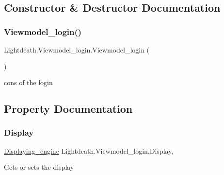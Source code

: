 \subsection{Constructor \& Destructor Documentation}
\hypertarget{class_lightdeath_1_1_viewmodel__login_a6e77485ee5cc5fce15ee6aaaa742bf7f}{}\label{class_lightdeath_1_1_viewmodel__login_a6e77485ee5cc5fce15ee6aaaa742bf7f} 
\subsubsection{\texorpdfstring{Viewmodel\+\_\+login()}{Viewmodel\_login()}}
{\footnotesize\ttfamily Lightdeath.\+Viewmodel\+\_\+login.\+Viewmodel\+\_\+login (\begin{DoxyParamCaption}{ }\end{DoxyParamCaption})\hspace{0.3cm}{\ttfamily [inline]}}



cons of the login 



\subsection{Property Documentation}
\hypertarget{class_lightdeath_1_1_viewmodel__login_a9e9f20161e479af012827444cd45bc03}{}\label{class_lightdeath_1_1_viewmodel__login_a9e9f20161e479af012827444cd45bc03} 
\subsubsection{\texorpdfstring{Display}{Display}}
{\footnotesize\ttfamily \hyperlink{class_lightdeath_1_1_displaying__engine}{Displaying\+\_\+engine} Lightdeath.\+Viewmodel\+\_\+login.\+Display\hspace{0.3cm}{\ttfamily [get]}, {\ttfamily [set]}}



Gets or sets the display 

\hypertarget{class_lightdeath_1_1_viewmodel__login_a9ba15fc864f74a123236b120571c8a1c}{}\label{class_lightdeath_1_1_viewmodel__login_a9ba15fc864f74a123236b120571c8a1c} 

